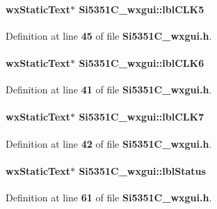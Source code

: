 \paragraph[{lbl\+C\+L\+K5}]{\setlength{\rightskip}{0pt plus 5cm}wx\+Static\+Text$\ast$ Si5351\+C\+\_\+wxgui\+::lbl\+C\+L\+K5}\label{classSi5351C__wxgui_a94cf0181df37c7d7f0192bd0a3176c6b}


Definition at line {\bf 45} of file {\bf Si5351\+C\+\_\+wxgui.\+h}.

\paragraph[{lbl\+C\+L\+K6}]{\setlength{\rightskip}{0pt plus 5cm}wx\+Static\+Text$\ast$ Si5351\+C\+\_\+wxgui\+::lbl\+C\+L\+K6}\label{classSi5351C__wxgui_aef14010947b31d6bcde0f946abe36e98}


Definition at line {\bf 41} of file {\bf Si5351\+C\+\_\+wxgui.\+h}.

\paragraph[{lbl\+C\+L\+K7}]{\setlength{\rightskip}{0pt plus 5cm}wx\+Static\+Text$\ast$ Si5351\+C\+\_\+wxgui\+::lbl\+C\+L\+K7}\label{classSi5351C__wxgui_a79a996270de2cc5a32112c228946d765}


Definition at line {\bf 42} of file {\bf Si5351\+C\+\_\+wxgui.\+h}.

\paragraph[{lbl\+Status}]{\setlength{\rightskip}{0pt plus 5cm}wx\+Static\+Text$\ast$ Si5351\+C\+\_\+wxgui\+::lbl\+Status}\label{classSi5351C__wxgui_af874d39a5f974be3300ffe357ba38e08}


Definition at line {\bf 61} of file {\bf Si5351\+C\+\_\+wxgui.\+h}.


